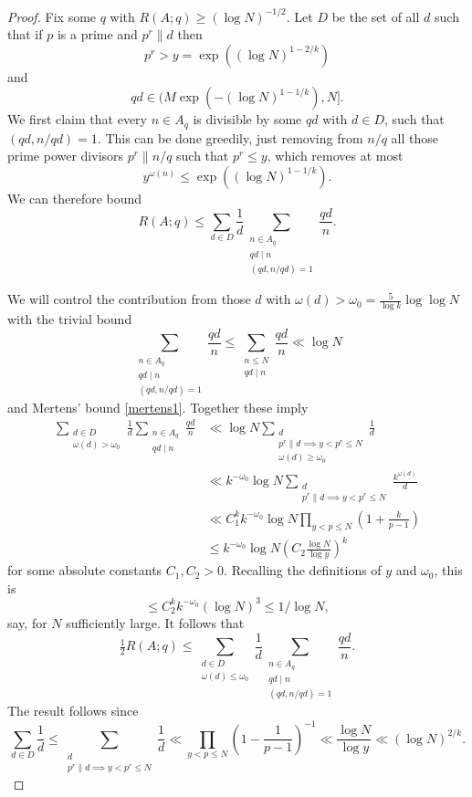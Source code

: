 \documentclass{amsart}
\newcommand{\brac}[1]{\left( #1\right)}
\begin{document}
\begin{proof}
Fix some $q$ with $R(A;q)\geq (\log N)^{-1/2}$. Let $D$ be the set of all $d$ such that if $p$ is a prime and $p^r \| d$ then 
\[p^r>y=\exp((\log N)^{1-2/k})\]
and 
\[qd\in (M\exp(-(\log N)^{1-1/k}),N].\]
We first claim that every $n\in A_q$ is divisible by some $qd$ with $d\in D$, such that $(qd,n/qd)=1$. This can be done greedily, just removing from $n/q$ all those prime power divisors $p^r\| n/q$ such that $p^r\leq y$, which removes at most 
\[y^{\omega(n)}\leq  \exp((\log N)^{1-1/k}).\]
We can therefore bound
\[R(A;q) \leq \sum_{d\in D}\frac{1}{d}\sum_{\substack{n\in A_q\\ qd\mid n\\ (qd,n/qd)=1}}\frac{qd}{n}.\]

We will control the contribution from those $d$ with $\omega(d)>\omega_0= \frac{5}{\log k}\log\log N$ with the trivial bound
\[\sum_{\substack{n\in A_q\\ qd\mid n\\ (qd,n/qd)=1}}\frac{qd}{n} \leq \sum_{\substack{n\leq N\\ qd\mid n}}\frac{qd}{n}\ll \log N\]
and Mertens' bound \eqref{mertens1}. Together these imply
\begin{align*}
\sum_{\substack{d\in D\\ \omega(d)>\omega_0}}\frac{1}{d}\sum_{\substack{n\in A_q\\ qd\mid n}}\frac{qd}{n}
&\ll \log N\sum_{\substack{d\\ p^r\| d\implies y<p^r\leq N\\ \omega(d)\geq \omega_0}} \frac{1}{d}\\
&\ll
k^{-\omega_0}\log N\sum_{\substack{d\\ p^r\| d\implies y<p^r\leq N}} \frac{k^{\omega(d)}}{d}\\
&\ll C_1^kk^{-\omega_0}\log N\prod_{y<p\leq N}(1+\frac{k}{p-1}) \\
 &\leq k^{-\omega_0}\log N\brac{C_2\frac{\log N}{\log y}}^{k}
\end{align*}
for some absolute constants $C_1,C_2>0$. Recalling the definitions of $y$ and $\omega_0$, this is
\[\leq C_2^kk^{-\omega_0}(\log N)^3\leq 1/\log N,\]
say, for $N$ sufficiently large. It follows that
\[\tfrac{1}{2}R(A;q)\leq \sum_{\substack{d\in D\\ \omega(d)\leq \omega_0}}\frac{1}{d}\sum_{\substack{n\in A_q\\ qd\mid n\\ (qd,n/qd)=1}}\frac{qd}{n} .\]
The result follows since 
\[\sum_{d\in D}\frac{1}{d}\leq \sum_{\substack{d\\ p^r\| d\implies y<p^r\leq N}}\frac{1}{d} \ll \prod_{y<p\leq N}\brac{1-\frac{1}{p-1}}^{-1}\ll \frac{\log N}{\log y}\ll (\log N)^{2/k}.\]
\end{proof}
\end{document}
